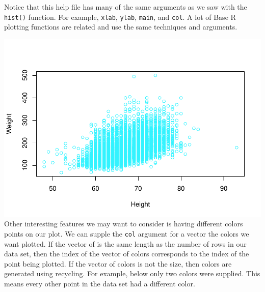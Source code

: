 \documentclass[
]{book}
\newenvironment{Shaded}{\begin{snugshade}}{\end{snugshade}}
\newcommand{\CommentTok}[1]{\textcolor[rgb]{0.56,0.35,0.01}{\textit{#1}}}
\newcommand{\DataTypeTok}[1]{\textcolor[rgb]{0.13,0.29,0.53}{#1}}
\newcommand{\KeywordTok}[1]{\textcolor[rgb]{0.13,0.29,0.53}{\textbf{#1}}}
\newcommand{\NormalTok}[1]{#1}
\newcommand{\OperatorTok}[1]{\textcolor[rgb]{0.81,0.36,0.00}{\textbf{#1}}}
\newcommand{\StringTok}[1]{\textcolor[rgb]{0.31,0.60,0.02}{#1}}
\begin{document}
Notice that this help file has many of the same arguments as we saw with the \texttt{hist()} function. For example, \texttt{xlab}, \texttt{ylab}, \texttt{main}, and \texttt{col}. A lot of Base R plotting functions are related and use the same techniques and arguments.

\begin{Shaded}
\end{Shaded}

\includegraphics{_main_files/figure-latex/unnamed-chunk-180-1.pdf}
Other interesting features we may want to consider is having different colors points on our plot. We can supple the \texttt{col} argument for a vector the colors we want plotted. If the vector of is the same length as the number of rows in our data set, then the index of the vector of colors corresponds to the index of the point being plotted. If the vector of colors is not the size, then colors are generated using recycling. For example, below only two colors were supplied. This means every other point in the data set had a different color.

\begin{Shaded}
\end{Shaded}
\end{document}
